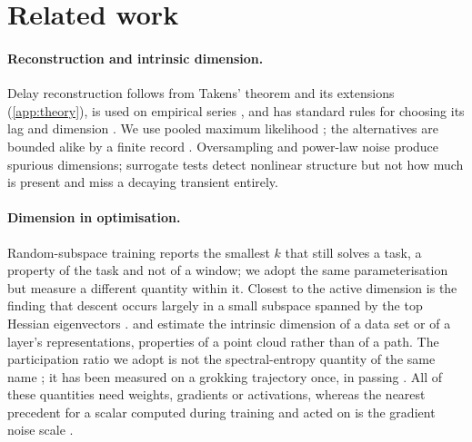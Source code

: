 \documentclass[twoside]{article}
\begin{document}
\section{Related work}\label{sec:related}

\paragraph{Reconstruction and intrinsic dimension.} Delay reconstruction follows from Takens'
theorem and its extensions (\cref{app:theory}), is used on empirical series \citep{sugihara1990nonlinear,
sugihara2012detecting}, and has standard rules for choosing its lag and dimension
\citep{fraser1986independent, kennel1992determining, cao1997practical,
broomhead1986extracting}. We use pooled maximum likelihood
\citep{levina2004maximum, mackay2005comments}; the alternatives \citep{grassberger1983measuring,
facco2017estimating, camastra2016intrinsic} are bounded alike by a finite record
\citep{eckmann1992fundamental}. Oversampling \citep{theiler1986spurious} and power-law
noise \citep{osborne1989finite} produce spurious dimensions; surrogate tests
\citep{theiler1992testing, schreiber1996improved} detect nonlinear structure but not how much is
present and miss a decaying transient entirely.

\paragraph{Dimension in optimisation.} Random-subspace training \citep{li2018measuring,
aghajanyan2021intrinsic} reports the smallest $k$ that still solves a task, a property of the task
and not of a window; we adopt the same parameterisation but measure a different quantity within it.
Closest to the active dimension is the finding that descent occurs largely in a small subspace
spanned by the top Hessian eigenvectors \citep{gurari2018gradient, sagun2018empirical}.
 and \citet{pope2021intrinsic} estimate the intrinsic dimension of a
data set or of a layer's representations, properties of a point cloud rather than of a path.
The participation ratio we adopt \citep{gao2017theory} is not
the spectral-entropy quantity of the same name \citep{roy2007effective}; it has been measured on a
grokking trajectory once, in passing \citep{notsawo2023predicting}. All of these quantities need
weights, gradients or activations, whereas the nearest precedent for a scalar computed during
training and acted on is the gradient noise scale \citep{mccandlish2018empirical}.
\end{document}
